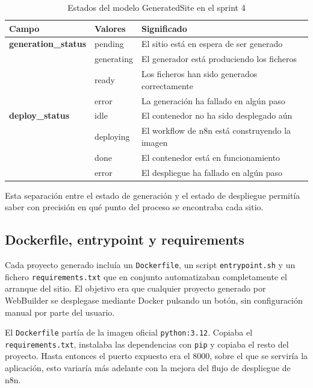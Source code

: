 \begin{table}[H]
    \centering
    \begin{tabular}{|l|l|p{7cm}|}
        \hline
        \textbf{Campo} & \textbf{Valores} & \textbf{Significado} \\
        \hline
        \textbf{generation\_status} & pending & El sitio está en espera de ser generado \\
        \hline
        & generating & El generador está produciendo los ficheros \\
        \hline
        & ready & Los ficheros han sido generados correctamente \\
        \hline
        & error & La generación ha fallado en algún paso \\
        \hline
        \textbf{deploy\_status} & idle & El contenedor no ha sido desplegado aún \\
        \hline
        & deploying & El workflow de n8n está construyendo la imagen \\
        \hline
        & done & El contenedor está en funcionamiento \\
        \hline
        & error & El despliegue ha fallado en algún paso \\
        \hline
    \end{tabular}
    \caption{Estados del modelo GeneratedSite en el sprint 4}
    \label{tab:estados-generatedsite}
\end{table}

Esta separación entre el estado de generación y el estado de despliegue 
permitía saber con precisión en qué punto del proceso se encontraba cada sitio.

\subsection{Dockerfile, entrypoint y requirements}
\label{subsec:dockerfile}

Cada proyecto generado incluía un \texttt{Dockerfile}, un script \texttt{entrypoint.sh} y un fichero \texttt{requirements.txt} que en conjunto automatizaban completamente el arranque del sitio. El objetivo era que cualquier proyecto generado por WebBuilder se desplegase mediante Docker pulsando un botón, sin configuración manual por parte del usuario.

El \texttt{Dockerfile} partía de la imagen oficial \texttt{python:3.12}. Copiaba el \\ \texttt{requirements.txt}, instalaba las dependencias con \texttt{pip} y copiaba el resto del proyecto. Hasta entonces el puerto expuesto era el 8000, sobre el que se serviría la aplicación, esto variaría más adelante con la mejora del flujo de despliegue de n8n.

